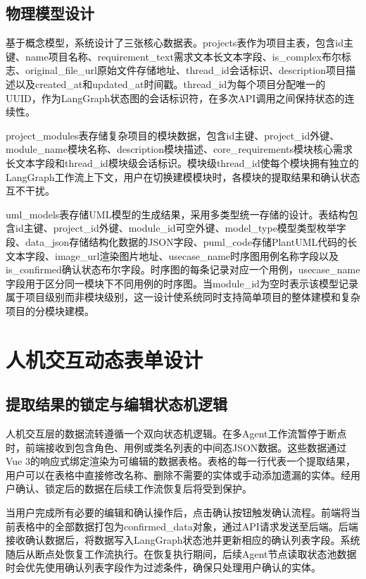 \subsection{物理模型设计}

基于概念模型，系统设计了三张核心数据表。projects表作为项目主表，包含id主键、name项目名称、requirement\_text需求文本长文本字段、is\_complex布尔标志、original\_file\_url原始文件存储地址、thread\_id会话标识、description项目描述以及created\_at和updated\_at时间戳。thread\_id为每个项目分配唯一的UUID，作为LangGraph状态图的会话标识符，在多次API调用之间保持状态的连续性。

project\_modules表存储复杂项目的模块数据，包含id主键、project\_id外键、module\_name模块名称、description模块描述、core\_requirements模块核心需求长文本字段和thread\_id模块级会话标识。模块级thread\_id使每个模块拥有独立的LangGraph工作流上下文，用户在切换建模模块时，各模块的提取结果和确认状态互不干扰。

uml\_models表存储UML模型的生成结果，采用多类型统一存储的设计。表结构包含id主键、project\_id外键、module\_id可空外键、model\_type模型类型枚举字段、data\_json存储结构化数据的JSON字段、puml\_code存储PlantUML代码的长文本字段、image\_url渲染图片地址、usecase\_name时序图用例名称字段以及is\_confirmed确认状态布尔字段。时序图的每条记录对应一个用例，usecase\_name字段用于区分同一模块下不同用例的时序图。当module\_id为空时表示该模型记录属于项目级别而非模块级别，这一设计使系统同时支持简单项目的整体建模和复杂项目的分模块建模。

\section{人机交互动态表单设计}

\subsection{提取结果的锁定与编辑状态机逻辑}

人机交互层的数据流转遵循一个双向状态机逻辑。在多Agent工作流暂停于断点时，前端接收到包含角色、用例或类名列表的中间态JSON数据。这些数据通过Vue 3的响应式绑定渲染为可编辑的数据表格。表格的每一行代表一个提取结果，用户可以在表格中直接修改名称、删除不需要的实体或手动添加遗漏的实体。经用户确认、锁定后的数据在后续工作流恢复后将受到保护。

当用户完成所有必要的编辑和确认操作后，点击确认按钮触发确认流程。前端将当前表格中的全部数据打包为confirmed\_data对象，通过API请求发送至后端。后端接收确认数据后，将数据写入LangGraph状态池并更新相应的确认列表字段。系统随后从断点处恢复工作流执行。在恢复执行期间，后续Agent节点读取状态池数据时会优先使用确认列表字段作为过滤条件，确保只处理用户确认的实体。

